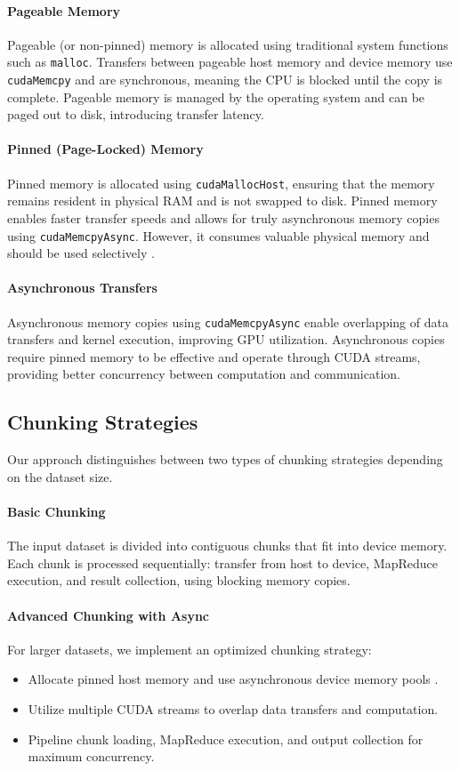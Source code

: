 \documentclass{article}
\begin{document}
\paragraph{Pageable Memory} Pageable (or non-pinned) memory is allocated using traditional system functions such as \texttt{malloc}. Transfers between pageable host memory and device memory use \texttt{cudaMemcpy} and are synchronous, meaning the CPU is blocked until the copy is complete. Pageable memory is managed by the operating system and can be paged out to disk, introducing transfer latency.

\paragraph{Pinned (Page-Locked) Memory} Pinned memory is allocated using \texttt{cudaMallocHost}, ensuring that the memory remains resident in physical RAM and is not swapped to disk. Pinned memory enables faster transfer speeds and allows for truly asynchronous memory copies using \texttt{cudaMemcpyAsync}. However, it consumes valuable physical memory and should be used selectively \cite{cuda_forum_async}.

\paragraph{Asynchronous Transfers} Asynchronous memory copies using \texttt{cudaMemcpyAsync} enable overlapping of data transfers and kernel execution, improving GPU utilization. Asynchronous copies require pinned memory to be effective and operate through CUDA streams, providing better concurrency between computation and communication.

\subsection{Chunking Strategies}
Our approach distinguishes between two types of chunking strategies depending on the dataset size.

\paragraph{Basic Chunking} The input dataset is divided into contiguous chunks that fit into device memory. Each chunk is processed sequentially: transfer from host to device, MapReduce execution, and result collection, using blocking memory copies.

\paragraph{Advanced Chunking with Async} For larger datasets, we implement an optimized chunking strategy:
\begin{itemize}
    \item Allocate pinned host memory and use asynchronous device memory pools \cite{cuda_mem_pool}.
    \item Utilize multiple CUDA streams to overlap data transfers and computation.
    \item Pipeline chunk loading, MapReduce execution, and output collection for maximum concurrency.
\end{itemize}
\end{document}
